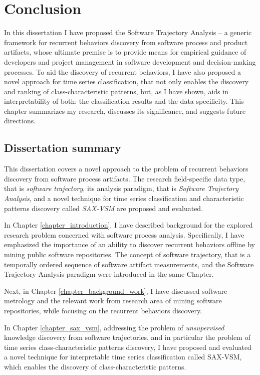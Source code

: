 \chapter{Conclusion}\label{chapter_conclusion}
In this dissertation I have proposed the Software Trajectory Analysis -- a generic framework for recurrent behaviors discovery from software process and product artifacts, whose ultimate premise is to provide means for empirical guidance of developers and project management in software development and decision-making processes. To aid the discovery of recurrent behaviors, I have also proposed a novel approach for time series classification, that not only enables the discovery and ranking of class-characteristic patterns, but, as I have shown, aids in interpretability of both: the classification results and the data specificity. This chapter summarizes my research, discusses its significance, and suggests future directions. 

\section{Dissertation summary}
This dissertation covers a novel approach to the problem of recurrent behaviors discovery from software process artifacts. The research field-specific data type, that is \textit{software trajectory}, its analysis paradigm, that is \textit{Software Trajectory Analysis}, and a novel technique for time series classification and characteristic patterns discovery called \textit{SAX-VSM} are proposed and evaluated.

In Chapter \ref{chapter_introduction}, I have described background for the explored research problem concerned with software process analysis. Specifically, I have emphasized the importance of an ability to discover recurrent behaviors offline by mining  public software repositories. The concept of software trajectory, that is a temporally ordered sequence of software artifact measurements, and the Software Trajectory Analysis paradigm were introduced in the same Chapter.

Next, in Chapter \ref{chapter_background_work}, I have discussed software metrology and the relevant work from research area of mining software repositories, while focusing on the recurrent behaviors discovery. 

In Chapter \ref{chapter_sax_vsm}, addressing the problem of \textit{unsupervised} knowledge discovery from software trajectories, and in particular the problem of time series class-characteristic patterns discovery, I have proposed and evaluated a novel technique for interpretable time series classification called SAX-VSM, which enables the discovery of class-characteristic patterns.

